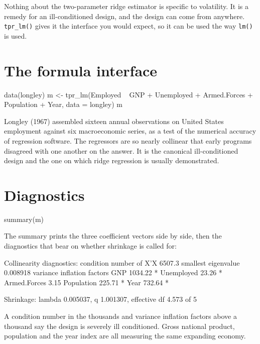 \documentclass[11pt,a4paper]{report}
\begin{document}
Nothing about the two-parameter ridge estimator is specific to
volatility. It is a remedy for an ill-conditioned design, and the design
can come from anywhere. \texttt{tpr\_lm()} gives it the interface you
would expect, so it can be used the way \texttt{lm()} is used.

\section{The formula interface}

\begin{Rblock}
data(longley)
m <- tpr_lm(Employed ~ GNP + Unemployed + Armed.Forces +
              Population + Year, data = longley)
m
\end{Rblock}

Longley (1967) assembled sixteen annual observations on United States
employment against six macroeconomic series, as a test of the numerical
accuracy of regression software. The regressors are so nearly collinear
that early programs disagreed with one another on the answer. It is the
canonical ill-conditioned design and the one on which ridge regression
is usually demonstrated.

\section{Diagnostics}

\begin{Rblock}
summary(m)
\end{Rblock}

The summary prints the three coefficient vectors side by side, then the
diagnostics that bear on whether shrinkage is called for:

\begin{Rblock}
Collinearity diagnostics:
  condition number of X'X      6507.3
  smallest eigenvalue          0.008918
  variance inflation factors
    GNP                   1034.22  *
    Unemployed              23.26  *
    Armed.Forces             3.15
    Population             225.71  *
    Year                   732.64  *

Shrinkage:
  lambda 0.005037,  q 1.001307,  effective df 4.573 of 5
\end{Rblock}

A condition number in the thousands and variance inflation factors above
a thousand say the design is severely ill conditioned. Gross national
product, population and the year index are all measuring the same
expanding economy.
\end{document}
